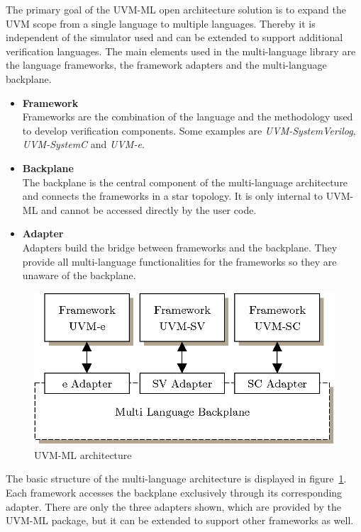 The primary goal of the UVM-ML open architecture solution is to expand the UVM scope from a single language to multiple
languages. Thereby it is independent of the simulator used and can be extended to support additional verification
languages. The main elements used in the multi-language library are the language frameworks, the framework adapters and
the multi-language backplane.
\begin{itemize}
  \item\textbf{Framework}\\
  Frameworks are the combination of the language and the methodology used to develop verification components. Some
  examples are \emph{UVM-SystemVerilog}, \emph{UVM-SystemC} and \emph{UVM-\textit{e}}.
  \item\textbf{Backplane}\\
  The backplane is the central component of the multi-language architecture and connects the frameworks in a star
  topology.
  It is only internal to UVM-ML and cannot be accessed directly by the user code.
  \item\textbf{Adapter}\\
  Adapters build the bridge between frameworks and the backplane. They provide all multi-language functionalities for
  the frameworks so they are unaware of the backplane.
\end{itemize}

\begin{figure}[htb]
 \centering
 \includegraphics[scale=0.3]{abb/UVM_ML_architecture}
 \caption{UVM-ML architecture}
\label{fig:UVM_ML_architecture}
\end{figure}

The basic structure of the multi-language architecture is displayed in figure~\ref{fig:UVM_ML_architecture}. Each
framework accesses the backplane exclusively through its corresponding adapter. There are only the three adapters shown,
which are provided by the UVM-ML package, but it can be extended to support other frameworks as well.


